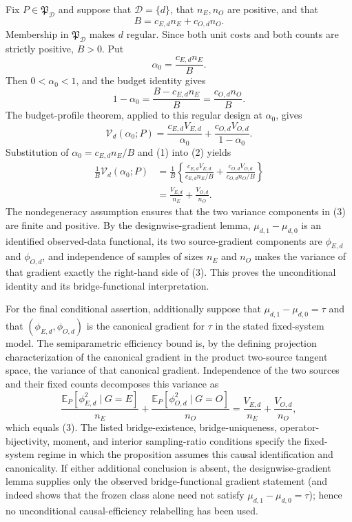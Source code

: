 Fix \(P\in\mathfrak P_{\mathcal D}\) and suppose that \(\mathcal D=\{d\}\), that \(n_E,n_O\) are positive, and that
\[
 B=c_{E,d}n_E+c_{O,d}n_O.
\]
Membership in \(\mathfrak P_{\mathcal D}\) makes \(d\) regular.  Since both unit costs and both counts are strictly positive, \(B>0\).  Put
\[
 \alpha_0=\frac{c_{E,d}n_E}{B}.
\]
Then \(0<\alpha_0<1\), and the budget identity gives
\[
 1-\alpha_0
 =\frac{B-c_{E,d}n_E}{B}
 =\frac{c_{O,d}n_O}{B}.                                      \tag{1}
\]
The budget-profile theorem, applied to this regular design at \(\alpha_0\), gives
\[
 \mathcal V_d(\alpha_0;P)
 =\frac{c_{E,d}V_{E,d}}{\alpha_0}
  +\frac{c_{O,d}V_{O,d}}{1-\alpha_0}.                         \tag{2}
\]
Substitution of \(\alpha_0=c_{E,d}n_E/B\) and (1) into (2) yields
\[
\begin{aligned}
 \frac{1}{B}\mathcal V_d(\alpha_0;P)
 &=\frac{1}{B}\left\{
   \frac{c_{E,d}V_{E,d}}{c_{E,d}n_E/B}
   +\frac{c_{O,d}V_{O,d}}{c_{O,d}n_O/B}
   \right\}\\
 &=\frac{V_{E,d}}{n_E}+\frac{V_{O,d}}{n_O}.                  \tag{3}
\end{aligned}
\]
The nondegeneracy assumption ensures that the two variance components in (3) are finite and positive.  By the designwise-gradient lemma, \(\mu_{d,1}-\mu_{d,0}\) is an identified observed-data functional, its two source-gradient components are \(\phi_{E,d}\) and \(\phi_{O,d}\), and independence of samples of sizes \(n_E\) and \(n_O\) makes the variance of that gradient exactly the right-hand side of (3).  This proves the unconditional identity and its bridge-functional interpretation.

For the final conditional assertion, additionally suppose that \(\mu_{d,1}-\mu_{d,0}=\tau\) and that \((\phi_{E,d},\phi_{O,d})\) is the canonical gradient for \(\tau\) in the stated fixed-system model.  The semiparametric efficiency bound is, by the defining projection characterization of the canonical gradient in the product two-source tangent space, the variance of that canonical gradient.  Independence of the two sources and their fixed counts decomposes this variance as
\[
 \frac{\mathbb E_P[\phi_{E,d}^2\mid G=E]}{n_E}
 +\frac{\mathbb E_P[\phi_{O,d}^2\mid G=O]}{n_O}
 =\frac{V_{E,d}}{n_E}+\frac{V_{O,d}}{n_O},                  \tag{4}
\]
which equals (3).  The listed bridge-existence, bridge-uniqueness, operator-bijectivity, moment, and interior sampling-ratio conditions specify the fixed-system regime in which the proposition assumes this causal identification and canonicality.  If either additional conclusion is absent, the designwise-gradient lemma supplies only the observed bridge-functional gradient statement (and indeed shows that the frozen class alone need not satisfy \(\mu_{d,1}-\mu_{d,0}=\tau\)); hence no unconditional causal-efficiency relabelling has been used.